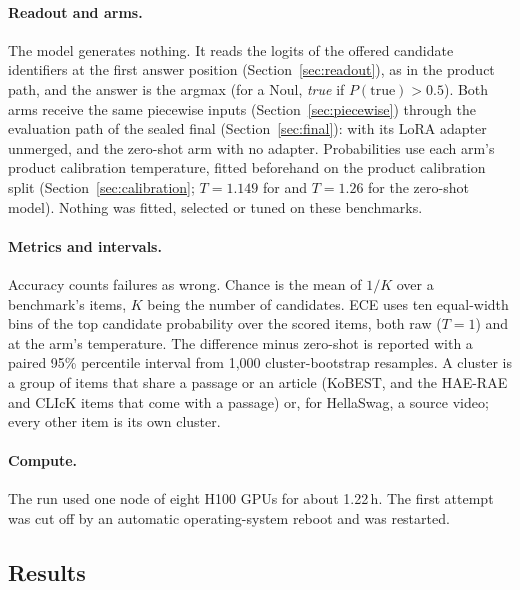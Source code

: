 \paragraph{Readout and arms.}
The model generates nothing. It reads the logits of the offered candidate identifiers at the
first answer position (Section~\ref{sec:readout}), as in the product path, and the answer is
the argmax (for a Noul, \emph{true} if $P(\text{true})>0.5$). Both arms receive the same
piecewise inputs (Section~\ref{sec:piecewise}) through the evaluation path of the sealed
final (Section~\ref{sec:final}): \expone{} with its LoRA adapter unmerged, and the zero-shot
arm with no adapter. Probabilities use each arm's product calibration temperature, fitted
beforehand on the product calibration split (Section~\ref{sec:calibration}; $T=1.149$ for
\expone{} and $T=1.26$ for the zero-shot model). Nothing was fitted, selected or tuned on these
benchmarks.

\paragraph{Metrics and intervals.}
Accuracy counts failures as wrong. Chance is the mean of $1/K$ over a benchmark's items, $K$
being the number of candidates. ECE uses ten equal-width bins of the top candidate
probability over the scored items, both raw ($T=1$) and at the arm's temperature. The
difference \expone{} minus zero-shot is reported with a paired 95\% percentile interval from
1,000 cluster-bootstrap resamples. A cluster is a group of items that share a passage or an
article (KoBEST, and the HAE-RAE and CLIcK items that come with a passage) or, for HellaSwag,
a source video; every other item is its own cluster.

\paragraph{Compute.}
The run used one node of eight H100 GPUs for about 1.22\,h. The first attempt was cut off by
an automatic operating-system reboot and was restarted.

\subsection{Results}

